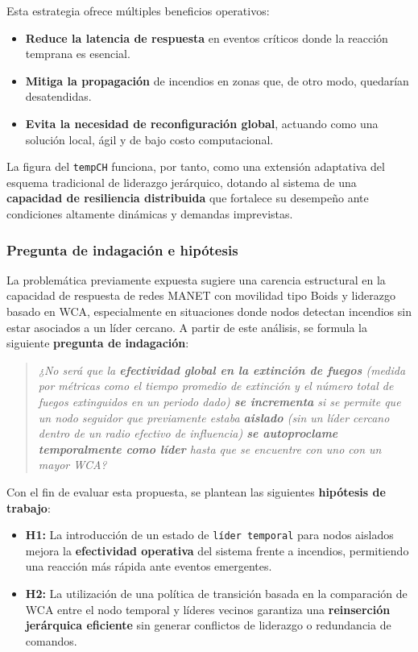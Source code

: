 \documentclass{article}
\begin{document}
Esta estrategia ofrece múltiples beneficios operativos:
\begin{itemize}
    \item \textbf{Reduce la latencia de respuesta} en eventos críticos donde la reacción temprana es esencial.
    \item \textbf{Mitiga la propagación} de incendios en zonas que, de otro modo, quedarían desatendidas.
    \item \textbf{Evita la necesidad de reconfiguración global}, actuando como una solución local, ágil y de bajo costo computacional.
\end{itemize}

La figura del \texttt{tempCH} funciona, por tanto, como una extensión adaptativa del esquema tradicional de liderazgo jerárquico, dotando al sistema de una \textbf{capacidad de resiliencia distribuida} que fortalece su desempeño ante condiciones altamente dinámicas y demandas imprevistas.


\subsubsection{Pregunta de indagación e hipótesis}

La problemática previamente expuesta sugiere una carencia estructural en la capacidad de respuesta de redes MANET con movilidad tipo Boids y liderazgo basado en WCA, especialmente en situaciones donde nodos detectan incendios sin estar asociados a un líder cercano. A partir de este análisis, se formula la siguiente \textbf{pregunta de indagación}:

\begin{quote}
\textit{¿No será que la \textbf{efectividad global en la extinción de fuegos} (medida por métricas como el tiempo promedio de extinción y el número total de fuegos extinguidos en un periodo dado) \textbf{se incrementa} si se permite que un nodo seguidor que previamente estaba \textbf{aislado} (sin un líder cercano dentro de un radio efectivo de influencia) \textbf{se autoproclame temporalmente como líder} hasta que se encuentre con uno con un mayor WCA?}
\end{quote}

Con el fin de evaluar esta propuesta, se plantean las siguientes \textbf{hipótesis de trabajo}:

\begin{itemize}
    \item \textbf{H1:} La introducción de un estado de \texttt{líder temporal} para nodos aislados mejora la \textbf{efectividad operativa} del sistema frente a incendios, permitiendo una reacción más rápida ante eventos emergentes.
    
    \item \textbf{H2:} La utilización de una política de transición basada en la comparación de WCA entre el nodo temporal y líderes vecinos garantiza una \textbf{reinserción jerárquica eficiente} sin generar conflictos de liderazgo o redundancia de comandos.
\end{itemize}
\end{document}
